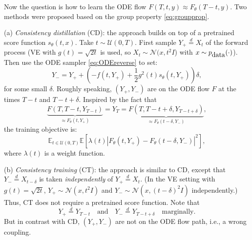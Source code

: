 \documentclass[letterpaper,11pt,reqno]{amsart}
\numberwithin{equation}{section}
\begin{document}
\quad Now the question is how to learn the ODE flow $F(T,t, y) \approx F_\theta(T-t, y)$.
Two methods were proposed based on
the group property \eqref{eq:groupprop}. 

\medskip
\noindent
(a) {\em Consistency distillation} (CD): 
the approach builds on top of a pretrained score function $s_\theta(t,x)$.
Take $t \sim \mathcal{U}(0,T)$.
First sample $Y_+ \stackrel{d}{=}  X_t$ of the forward process
(VE with $g(t) = \sqrt{2t}$ is used, so $X_t \sim \mathcal{N}(x, t^2 I$) with $x \sim p_{\tiny \mbox{data}}(\cdot)$).
Then use the ODE sampler \eqref{eq:ODEreverse} to set:
\begin{equation}
Y_{-} = Y_+ + \left(-f(t, Y_+) + \frac{1}{2} g^2(t) s_\theta(t, Y_+)\right) \delta,
\end{equation}
for some small $\delta$.
Roughly speaking, 
$(Y_+, Y_{-})$ are on the ODE flow $F$ at the times $T-t$ and $T- t + \delta$.
Inspired by the fact that
\begin{equation*}
\underbrace{F(T, T-t, Y_{T-t})}_{\approx F_\theta(t, Y_+)} = Y_T = \underbrace{F(T, T-t+ \delta, Y_{T-t + \delta})}_{\approx F_\theta(t - \delta, Y_{-})},
\end{equation*}
the training objective is:
\begin{equation}
\label{eq:CDTtrain}
\mathbb{E}_{t \in \mathcal{U}(0,T)} \mathbb{E}[\lambda(t) |F_\theta(t, Y_+) - F_\theta(t - \delta, Y_-)|^2],
\end{equation}
where $\lambda(t)$ is a weight function. 

\medskip
\noindent
(b) {\em Consistency training} (CT): 
the approach is similar to CD, except that
$Y_- \stackrel{d}{=} X_{t - \delta}$ is taken {\em independently} 
of $Y_{+} \stackrel{d}{=} X_t$.
(In the VE setting with $g(t) = \sqrt{2t}$, $Y_{+} \sim \mathcal{N}(x, t^2 I)$ and 
$Y_{-} \sim \mathcal{N}(x, (t- \delta)^2 I)$ independently.)
Thus, CT does not require a pretrained score function. 
Note that 
\begin{equation*}
Y_{+} \stackrel{d}{=} Y_{T-t} \quad \mbox{and} \quad Y_{-} \stackrel{d}{=} Y_{T-t+ \delta} \quad \mbox{marginally}.  
\end{equation*}
But in contrast with CD,
$(Y_{+}, Y_{-})$ are not on the ODE flow path, i.e., a wrong coupling.
\end{document}
